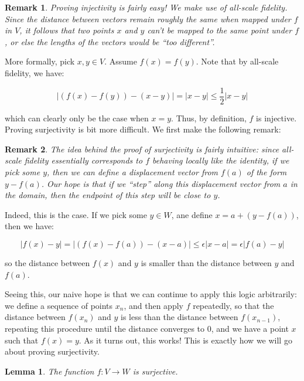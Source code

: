 \documentclass[10pt, oneside]{amsart}
\newtheorem{rem}{Remark}
\newtheorem{lem}{Lemma}
\begin{document}
    \begin{rem}
    Proving injectivity is fairly easy! We make use of all-scale fidelity. Since the distance between vectors remain roughly the same when mapped under $f$ in $V$, it follows that two points $x$ and $y$ can't be mapped
    to the same point under $f$, or else the lengths of the vectors would be ``too different''.
    \end{rem}

    More formally, pick $x, y \in V$. Assume $f(x) = f(y)$. Note that by all-scale fidelity, we have:

    $$| (f(x) - f(y)) - (x - y) | = |x - y| \leq \frac{1}{2} |x - y|$$

    which can clearly only be the case when $x = y$. Thus, by definition, $f$ is injective. Proving surjectivity is bit more difficult. We first make the following remark:

    \begin{rem}
      The idea behind the proof of surjectivity is fairly intuitive: since all-scale fidelity essentially corresponds to $f$ behaving locally like the identity, if we pick some $y$, then we can define a
      displacement vector from $f(a)$ of the form $y - f(a)$. Our hope is that if we ``step'' along this displacement vector from $a$ in the domain, then the endpoint of this step will be close to $y$. 
    \end{rem}

    Indeed, this is the case. If we pick some $y \in W$, ane define $x = a + (y - f(a))$, then we have:

    $$|f(x) - y| = |(f(x) - f(a)) - (x - a)| \leq \epsilon |x - a| = \epsilon |f(a) - y|$$

    so the distance between $f(x)$ and $y$ is smaller than the distance between $y$ and $f(a)$.
    \newline

    Seeing this, our naive hope is that we can continue to apply this logic arbitrarily: we define a sequence
    of points $x_n$, and then apply $f$ repeatedly, so that the distance between $f(x_n)$ and $y$ is less than the distance between $f(x_{n - 1})$, repeating this procedure until the distance converges to $0$, and we have a point
    $x$ such that $f(x) = y$. As it turns out, this works! This is exactly how we will go about proving surjectivity.

    \begin{lem}
      The function $f : V \rightarrow W$ is surjective.
    \end{lem}
\end{document}
